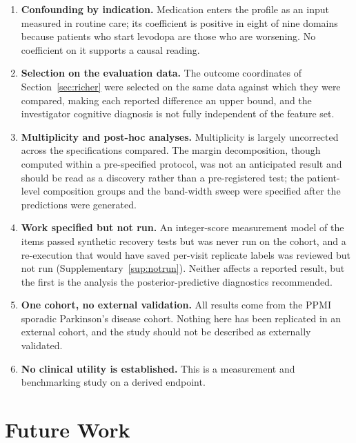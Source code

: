 \documentclass[11pt]{article}
\begin{document}
\begin{enumerate}
\item \textbf{Confounding by indication.} Medication enters the profile as an
input measured in routine care; its coefficient is positive in eight of nine
domains because patients who start levodopa are those who are worsening. No
coefficient on it supports a causal reading.

\item \textbf{Selection on the evaluation data.} The outcome coordinates of
Section~\ref{sec:richer} were selected on the same data against which they were
compared, making each reported difference an upper bound, and the investigator
cognitive diagnosis is not fully independent of the feature set.

\item \textbf{Multiplicity and post-hoc analyses.} Multiplicity is largely
uncorrected across the specifications compared. The margin decomposition, though
computed within a pre-specified protocol, was not an anticipated result and should
be read as a discovery rather than a pre-registered test; the patient-level
composition groups and the band-width sweep were specified after the predictions
were generated.

\item \textbf{Work specified but not run.} An integer-score measurement model of
the items passed synthetic recovery tests but was never run on the cohort, and a
re-execution that would have saved per-visit replicate labels was reviewed but not
run (Supplementary~\ref{sup:notrun}). Neither affects a reported result, but the
first is the analysis the posterior-predictive diagnostics recommended.

\item \textbf{One cohort, no external validation.} All results come from the PPMI
sporadic Parkinson's disease cohort. Nothing here has been replicated in an
external cohort, and the study should not be described as externally validated.

\item \textbf{No clinical utility is established.} This is a measurement and
benchmarking study on a derived endpoint.
\end{enumerate}

\section{Future Work}
\label{sec:future}
\end{document}
